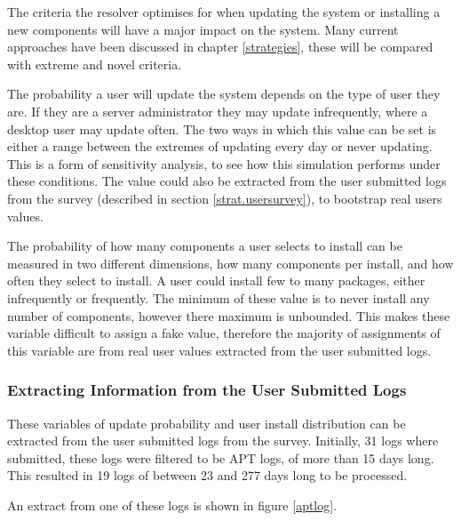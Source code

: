The criteria the resolver optimises for when updating the system or installing a new components will have a major impact on the system.
Many current approaches have been discussed in chapter \ref{strategies}, these will be compared with extreme and novel criteria.

The probability a user will update the system depends on the type of user they are.
If they are a server administrator they may update infrequently, where a desktop user may update often.
The two ways in which this value can be set is either a range between the extremes of updating every day or never updating.
This is a form of sensitivity analysis, to see how this simulation performs under these conditions.
The value could also be extracted from the user submitted logs from the survey (described in section \ref{strat.usersurvey}), to bootstrap real users values.

The probability of how many components a user selects to install can be measured in two different dimensions, how many components per install, and how often they select to install.
A user could install few to many packages, either infrequently or frequently.
The minimum of these value is to never install any number of components, however there maximum is unbounded.
This makes these variable difficult to assign a fake value, therefore the majority of assignments of this variable are from real user values extracted from the user submitted logs.

\subsubsection{Extracting Information from the User Submitted Logs}
These variables of update probability and user install distribution can be extracted from the user submitted logs from the survey.
Initially, 31 logs where submitted, these logs were filtered to be APT logs, of more than 15 days long.
This resulted in 19 logs of between 23 and 277 days long to be processed.

An extract from one of these logs is shown in figure \ref{aptlog}.


